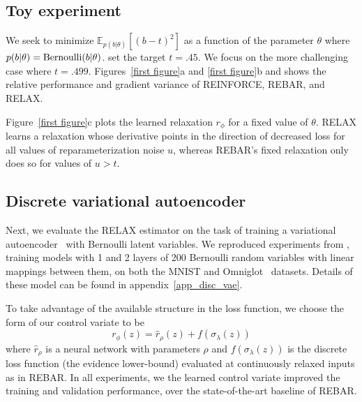 \documentclass{article}
\newcommand{\relaxed}{r}
\newcommand{\RELAX}{{\textnormal{RELAX}}}
\begin{document}
\subsection{Toy experiment}
We seek to minimize $\mathbb{E}_{p(b|\theta)}[(b - t)^2]$ as a function of the parameter $\theta$ where {$p(b|\theta) = \textnormal{Bernoulli}(b|\theta)$}. \cite{tucker2017rebar} set the target $t = .45$.
We focus on the more challenging case where $t = .499$.
Figures~\ref{first figure}a and \ref{first figure}b and shows the relative performance and gradient variance of REINFORCE, REBAR, and RELAX.

Figure~\ref{first figure}c plots the learned relaxation $r_\phi$ for a fixed value of $\theta$.
RELAX learns a relaxation whose derivative points in the direction of decreased loss for all values of reparameterization noise $u$, whereas REBAR's fixed relaxation only does so for values of $u > t$.


\subsection{Discrete variational autoencoder}
Next, we evaluate the \RELAX{} estimator on the task of training a variational autoencoder~\citep{kingma2013autoencoding, rezende2014stochastic} with Bernoulli latent variables.
We reproduced experiments from \citet{tucker2017rebar}, training models with 1 and 2 layers of 200 Bernoulli random variables with linear mappings between them, on both  the MNIST and Omniglot~\citep{lake2015human} datasets.
Details of these model can be found in appendix~\ref{app_disc_vae}.


To take advantage of the available structure in the loss function, we choose the form of our control variate to be $$ r_\phi(z) = \hat{r}_\rho(z) + f(\sigma_\lambda(z))$$ where $\hat{r}_\rho$ is a neural network with parameters $\rho$ and $f(\sigma_\lambda(z))$ is the discrete loss function (the evidence lower-bound) evaluated at continuously relaxed inputs as in REBAR.  
%
In all experiments, we the learned control variate improved the training and validation performance, over the state-of-the-art baseline of REBAR. 
\end{document}
